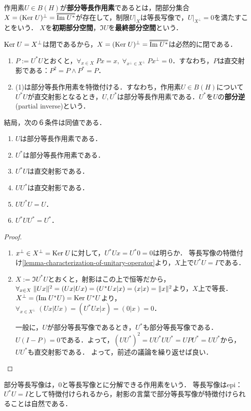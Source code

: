 \documentclass[uplatex,dvipdfmx]{jsreport}
\begin{document}
\begin{definition}
    作用素$U\in B(H)$が\textbf{部分等長作用素}であるとは，閉部分集合$X=(\Ker U)^\perp=\oo{\Im U^*}$が存在して，制限$U|_X$は等長写像で，$U|_{X^\perp}=0$を満たすことをいう．
    $X$を\textbf{初期部分空間}，$\Im U$を\textbf{最終部分空間}という．
\end{definition}
\begin{remarks}
    $\mathrm{Ker}\; U=X^\perp$は閉であるから，$X=(\Ker U)^\perp=\oo{\Im U^*}$は必然的に閉である．
\end{remarks}
\begin{lemma}[部分等長写像の特徴付け]\mbox{}
    \begin{enumerate}
        \item $P:=U^*U$とおくと，$\forall_{x\in X}\;Px=x,\;\forall_{x^\perp\in X^\perp}\;Px^\perp=0$．すなわち，$P$は直交射影である：$P^2=P\land P^*=P$．
        \item (1)は部分等長作用素を特徴付ける．すなわち，作用素$U\in B(H)$について$U^*U$が直交射影となるとき，$U,U^*$は部分等長作用素である．$U^*$を$U$の\textbf{部分逆}(partial inverse)という．
    \end{enumerate}
    結局，次の６条件は同値である．
    \begin{enumerate}
        \item $U$は部分等長作用素である．
        \item $U^*$は部分等長作用素である．
        \item $U^*U$は直交射影である．
        \item $UU^*$は直交射影である．
        \item $UU^*U=U$．
        \item $U^*UU^*=U^*$．
    \end{enumerate}
\end{lemma}
\begin{proof}\mbox{}
    \begin{enumerate}
        \item $x^\perp\in X^\perp=\mathrm{Ker}\; U$に対して，$U^*Ux=U^*0=0$は明らか．
        等長写像の特徴付け\ref{lemma-characterization-of-unitary-operator}より，$X$上で$U^*U=I$である．
        \item $X:=\Im U^*U$とおくと，射影はこの上で恒等だから，$\forall_{x\in X}\;\|Ux\|^2=(Ux|Ux)=(U^*Ux|x)=(x|x)=\|x\|^2$より，$X$上で等長．$X^\perp=(\mathrm{Im}\; U^*U)=\mathrm{Ker}\; U^*U$より，$\forall_{x\in X^\perp}\;(Ux|Ux)=(U^*Ux|x)=(0|x)=0$．
        
        一般に，$U$が部分等長写像であるとき，$U^*$も部分等長写像である．
        $U(I-P)=0$である．よって，$(UU^*)^2=UU^*UU^*=UPU^*=UU^*$から，$UU^*$も直交射影である．
        よって，前述の議論を繰り返せば良い．
    \end{enumerate}
\end{proof}
\begin{remarks}
    部分等長写像は，$0$と等長写像とに分解できる作用素をいう．
    等長写像はepi：$U^*U=I$として特徴付けられるから，射影の言葉で部分等長写像が特徴付けられることは自然である．
\end{remarks}
\end{document}

